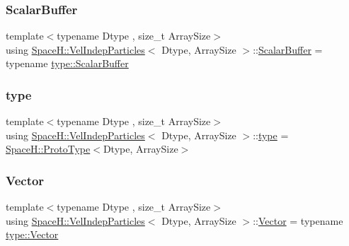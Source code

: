 \subsubsection{\texorpdfstring{Scalar\+Buffer}{ScalarBuffer}}
{\footnotesize\ttfamily template$<$typename Dtype , size\+\_\+t Array\+Size$>$ \\
using \mbox{\hyperlink{class_space_h_1_1_vel_indep_particles}{Space\+H\+::\+Vel\+Indep\+Particles}}$<$ Dtype, Array\+Size $>$\+::\mbox{\hyperlink{class_space_h_1_1_vel_indep_particles_abca40159a816385790d5a6fd19c1dc6d}{Scalar\+Buffer}} =  typename \mbox{\hyperlink{struct_space_h_1_1_proto_type_a62c491884996da10377d348a5aabad86}{type\+::\+Scalar\+Buffer}}}

\mbox{\label{class_space_h_1_1_vel_indep_particles_a09aa167b5fb1b203ab021220601ed74c}} 
\subsubsection{\texorpdfstring{type}{type}}
{\footnotesize\ttfamily template$<$typename Dtype , size\+\_\+t Array\+Size$>$ \\
using \mbox{\hyperlink{class_space_h_1_1_vel_indep_particles}{Space\+H\+::\+Vel\+Indep\+Particles}}$<$ Dtype, Array\+Size $>$\+::\mbox{\hyperlink{class_space_h_1_1_vel_indep_particles_a09aa167b5fb1b203ab021220601ed74c}{type}} =  \mbox{\hyperlink{struct_space_h_1_1_proto_type}{Space\+H\+::\+Proto\+Type}}$<$Dtype, Array\+Size$>$}

\mbox{\label{class_space_h_1_1_vel_indep_particles_a61bbcfdb0dc7f99f3c68af69a755c935}} 
\subsubsection{\texorpdfstring{Vector}{Vector}}
{\footnotesize\ttfamily template$<$typename Dtype , size\+\_\+t Array\+Size$>$ \\
using \mbox{\hyperlink{class_space_h_1_1_vel_indep_particles}{Space\+H\+::\+Vel\+Indep\+Particles}}$<$ Dtype, Array\+Size $>$\+::\mbox{\hyperlink{class_space_h_1_1_vel_indep_particles_a61bbcfdb0dc7f99f3c68af69a755c935}{Vector}} =  typename \mbox{\hyperlink{struct_space_h_1_1_proto_type_a316b81f4660b2b4fab14a8e1f23b6089}{type\+::\+Vector}}}

